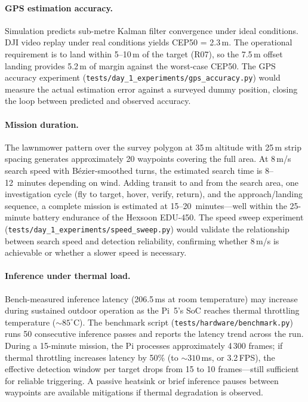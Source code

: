\paragraph{GPS estimation accuracy.}
Simulation predicts sub-metre Kalman filter convergence under ideal conditions.  DJI video replay under real conditions yields CEP50 = 2.3\,m.  The operational requirement is to land within 5--10\,m of the target (R07), so the 7.5\,m offset landing provides 5.2\,m of margin against the worst-case CEP50.  The GPS accuracy experiment (\texttt{tests/day\_1\_experiments/gps\_accuracy.py}) would measure the actual estimation error against a surveyed dummy position, closing the loop between predicted and observed accuracy.

\paragraph{Mission duration.}
The lawnmower pattern over the survey polygon at 35\,m altitude with 25\,m strip spacing generates approximately 20 waypoints covering the full area.  At 8\,m/s search speed with B\'{e}zier-smoothed turns, the estimated search time is 8--12~minutes depending on wind.  Adding transit to and from the search area, one investigation cycle (fly to target, hover, verify, return), and the approach/landing sequence, a complete mission is estimated at 15--20~minutes---well within the 25-minute battery endurance of the Hexsoon EDU-450.  The speed sweep experiment (\texttt{tests/day\_1\_experiments/speed\_sweep.py}) would validate the relationship between search speed and detection reliability, confirming whether 8\,m/s is achievable or whether a slower speed is necessary.

\paragraph{Inference under thermal load.}
Bench-measured inference latency (206.5\,ms at room temperature) may increase during sustained outdoor operation as the Pi~5's SoC reaches thermal throttling temperature (${\sim}85^{\circ}$C).  The benchmark script (\texttt{tests/hardware/benchmark.py}) runs 50 consecutive inference passes and reports the latency trend across the run.  During a 15-minute mission, the Pi processes approximately 4\,300 frames; if thermal throttling increases latency by 50\% (to ${\sim}310$\,ms, or 3.2\,FPS), the effective detection window per target drops from 15 to 10 frames---still sufficient for reliable triggering.  A passive heatsink or brief inference pauses between waypoints are available mitigations if thermal degradation is observed.

